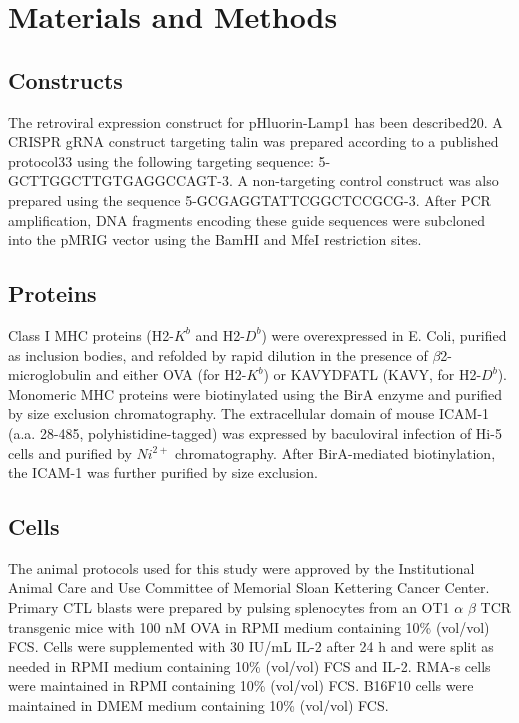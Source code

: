 \section{Materials and Methods}

\subsection{Constructs}
The retroviral expression construct for pHluorin-Lamp1 has been described20. A CRISPR gRNA construct targeting talin was prepared according to a published protocol33 using the following targeting sequence: 5\textquotesingle -GCTTGGCTTGTGAGGCCAGT-3\textquotesingle. A non-targeting control construct was also prepared using the sequence 5\textquotesingle -GCGAGGTATTCGGCTCCGCG-3\textquotesingle. After PCR amplification, DNA fragments encoding these guide sequences were subcloned into the pMRIG vector using the BamHI and MfeI restriction sites.

\subsection{Proteins}
Class I MHC proteins (H2-$K^{b}$ and H2-$D^{b}$) were overexpressed in E. Coli, purified as inclusion bodies, and refolded by rapid dilution in the presence of $\beta$2-microglobulin and either OVA (for H2-$K^{b}$) or KAVYDFATL (KAVY, for H2-$D^{b}$). Monomeric MHC proteins were biotinylated using the BirA enzyme and purified by size exclusion chromatography. The extracellular domain of mouse ICAM-1 (a.a. 28-485, polyhistidine-tagged) was expressed by baculoviral infection of Hi-5 cells and purified by $Ni^{2+}$ chromatography. After BirA-mediated biotinylation, the ICAM-1 was further purified by size exclusion.

\subsection{Cells}
The animal protocols used for this study were approved by the Institutional Animal Care and Use Committee of Memorial Sloan Kettering Cancer Center. Primary CTL blasts were prepared by pulsing splenocytes from an OT1 $\alpha$ $\beta$ TCR transgenic mice with 100 nM OVA in RPMI medium containing 10\% (vol/vol) FCS. Cells were supplemented with 30 IU/mL IL-2 after 24 h and were split as needed in RPMI medium containing 10\% (vol/vol) FCS and IL-2. RMA-s cells were maintained in RPMI containing 10\% (vol/vol) FCS. B16F10 cells were maintained in DMEM medium containing 10\% (vol/vol) FCS.

